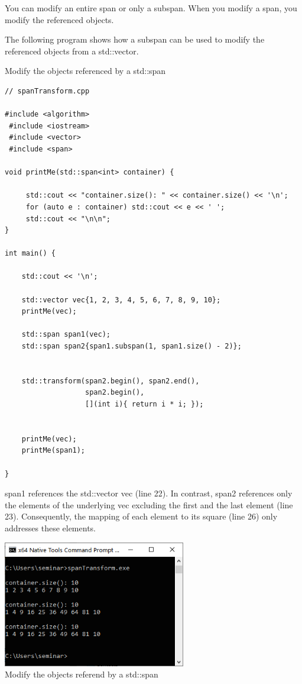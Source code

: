 
You can modify an entire span or only a subspan. When you modify a span, you modify the referenced objects.

The following program shows how a subspan can be used to modify the referenced objects from a std::vector.

\noindent
Modify the objects referenced by a std::span
\begin{lstlisting}[style=styleCXX]
// spanTransform.cpp

#include <algorithm>
 #include <iostream>
 #include <vector>
 #include <span>

void printMe(std::span<int> container) {
	
	 std::cout << "container.size(): " << container.size() << '\n';
	 for (auto e : container) std::cout << e << ' ';
	 std::cout << "\n\n";
}

int main() {

	std::cout << '\n';
	
	std::vector vec{1, 2, 3, 4, 5, 6, 7, 8, 9, 10};
	printMe(vec);
	
	std::span span1(vec);
	std::span span2{span1.subspan(1, span1.size() - 2)};
	
	
	std::transform(span2.begin(), span2.end(),
	               span2.begin(),
	               [](int i){ return i * i; });
	
	
	printMe(vec);
	printMe(span1);

}
\end{lstlisting}

span1 references the std::vector vec (line 22). In contrast, span2 references only the elements of the underlying vec excluding the first and the last element (line 23). Consequently, the mapping of each element to its square (line 26) only addresses these elements.

\begin{center}
\includegraphics[width=0.6\textwidth]{content/3/chapter5/images/7.png}\\
Modify the objects referend by a std::span
\end{center}


